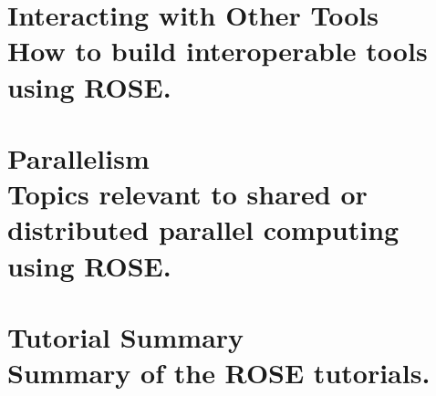 \documentclass[10pt]{book}
\begin{document}
\part[Interacting with Other Tools]{ Interacting with Other Tools \\
\vspace{1.0in}
\normalsize{How to build interoperable tools using ROSE.}
}






\part[Parallelism]{ Parallelism \\
\vspace{1.0in}
\normalsize{Topics relevant to shared or distributed parallel computing using ROSE.}
}





\part[Tutorial Summary]{ Tutorial Summary \\
\vspace{1.0in}
\normalsize{Summary of the ROSE tutorials.}
}

\backmatter



\end{document}
